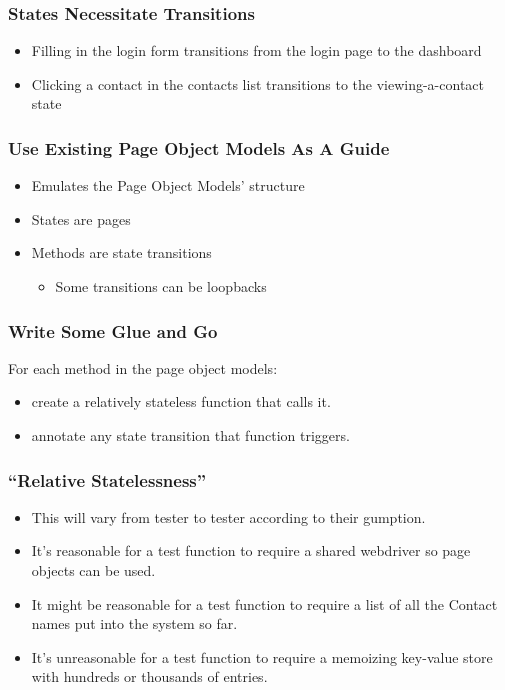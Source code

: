 \begin{frame}
  \frametitle{States Necessitate Transitions}
  \begin{itemize}
    \item Filling in the login form transitions from the login page to the dashboard
    \item Clicking a contact in the contacts list transitions to the viewing-a-contact state
  \end{itemize}
\end{frame}

\begin{frame}
  \frametitle{Use Existing Page Object Models As A Guide}
  \begin{itemize}
    \item Emulates the Page Object Models' structure
    \item States are pages
    \item Methods are state transitions
    \begin{itemize}
      \item Some transitions can be loopbacks
    \end{itemize}
  \end{itemize}
\end{frame}

\begin{frame}
  \frametitle{Write Some Glue and Go}
  For each method in the page object models:
  \begin{itemize}
    \item create a relatively stateless function that calls it.
    \item annotate any state transition that function triggers.
  \end{itemize}
\end{frame}

\begin{frame}
  \frametitle{``Relative Statelessness''}
  \begin{itemize}
    \item This will vary from tester to tester according to their gumption.
    \item It's reasonable for a test function to require a shared webdriver so page objects can be used.
    \item It might be reasonable for a test function to require a list of all the Contact names put into the system so far.
    \item It's unreasonable for a test function to require a memoizing key-value store with hundreds or thousands of entries.
\end{itemize}

\end{frame}

